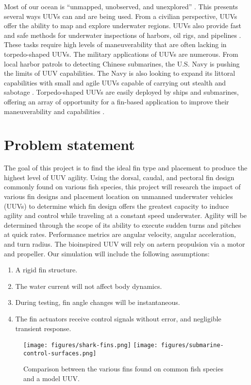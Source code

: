 \documentclass{IEEEtran}
\begin{document}
Most of our ocean is ``unmapped, unobserved, and unexplored'' \cite{noaa2009how}. This presents several ways UUVs can and are being used. From a civilian perspective, UUVs offer the ability to map and explore underwater regions. UUVs also provide fast and safe methods for underwater inspections of harbors, oil rigs, and pipelines \cite{maslin2020raising}. These tasks require high levels of maneuverability that are often lacking in torpedo-shaped UUVs. The military applications of UUVs are numerous. From local harbor patrols to detecting Chinese submarines, the U.S. Navy is pushing the limits of UUV capabilities. The Navy is also looking to expand its littoral capabilities with small and agile UUVs capable of carrying out stealth and sabotage \cite{berenice2018splash}. Torpedo-shaped UUVs are easily deployed by ships and submarines, offering an array of opportunity for a fin-based application to improve their maneuverability and capabilities \cite{orourke2020navy}.





\section{Problem statement}
The goal of this project is to find the ideal fin type and placement to produce the highest level of UUV agility. Using the dorsal, caudal, and pectoral fin design commonly found on various fish species, this project will research the impact of various fin designs and placement location on unmanned underwater vehicles (UUVs) to determine which fin design offers the greatest capacity to induce agility and control while traveling at a constant speed underwater. Agility will be determined through the scope of its ability to execute sudden turns and pitches at quick rates. Performance metrics are angular velocity, angular acceleration, and turn radius. The bioinspired UUV will rely on astern propulsion via a motor and propeller. Our simulation will include the following assumptions:
\begin{enumerate}
\item A rigid fin structure.
\item The water current will not affect body dynamics.
\item During testing, fin angle changes will be instantaneous.
\item The fin actuators receive control signals without error, and negligible transient response.
\end{enumerate}
\begin{figure*}
\begin{center}
\texttt{[image: figures/shark-fins.png]}
\texttt{[image: figures/submarine-control-surfaces.png]}
\end{center}
\caption{Comparison between the various fins found on common fish species and a model UUV.}
\label{fig:3}
\end{figure*}
\end{document}
